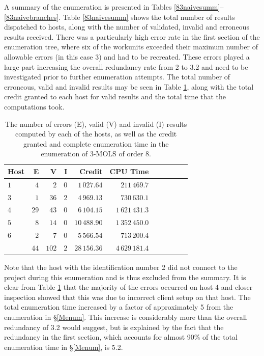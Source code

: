 A summary of the enumeration is presented in Tables  \ref{83naivesumm}--\ref{83naivebranches}. Table \ref{83naivesumm} shows the total number of results dispatched to hosts, along with the number of validated, invalid and erroneous results received.
 There was a particularly high error rate in the first section of the enumeration tree, where six of the workunits exceeded their maximum number of allowable errors (in this case 3) and had to be recreated. These errors played a large part increasing the overall redundancy rate from 2 to 3.2 and need to be investigated prior to further enumeration attempts.  The total number of erroneous, valid and invalid results may be seen in Table \ref{83naivehosts}, along with the total credit granted to each host for valid results and the total time that the computations took.
 \begin{table}
 \centering \vspace{-.2cm}\caption{The number of errors (E), valid (V) and invalid (I) results computed by each of the hosts, as well as the credit granted and complete enumeration time in the enumeration of 3-MOLS of order 8.}\vspace*{-.2cm}
\begin{tabular}{lrrrrrrrrrr}
\toprule
Host & E & V & I & Credit  & CPU Time \\ \midrule
$1$ & $4$ & $2$ & $0$ & $1\,027.64$ & $211\,469.7$ \\
$3$ & $1$ & $36$ & $2$ & $4\,969.13$ & $730\,630.1$ \\
$4$ & $29$ & $43$ & $0$ & $6\,104.15$ & $1\,621\,431.3$ \\
$5$ & $8$ & $14$ & $0$ & $10\,488.90$ & $1\,352\,450.0$ \\
$6$ & $2$ & $7$ & $0$ & $5\,566.54$ & $713\,200.4$ \\ \midrule
  & $44$ & $102$ & $2$ & $28\,156.36$& $4\,629\,181.4$\\
 \bottomrule
\end{tabular}\vspace*{.1cm}
\label{83naivehosts}
\end{table} 
 Note that the host with the identification number 2 did not connect to the project during this enumeration and is thus excluded from the summary.   
 It is clear from Table \ref{83naivehosts} that the majority of the errors occurred on   host 4 and closer inspection showed that this was due to incorrect client setup on that host. The total enumeration time increased by a factor of approximately 5 from the enumeration in \S\ref{Menum}. This increase is considerably more than the overall redundancy of 3.2 would suggest,  but is   explained by the fact that the redundancy in the first section, which accounts for almost 90\% of the total enumeration time in \S\ref{Menum}, is 5.2.

